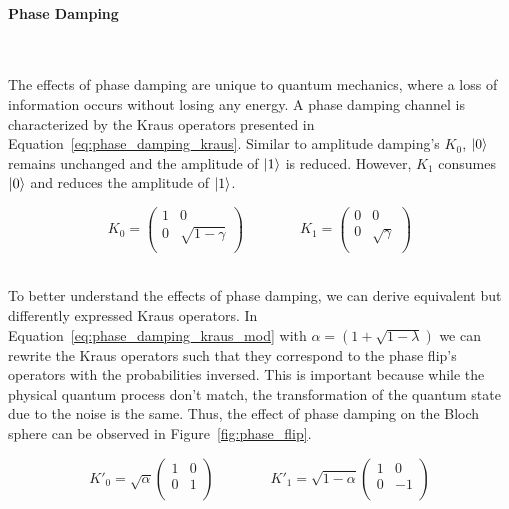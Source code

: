 \paragraph{Phase Damping} \

The effects of phase damping are unique to quantum mechanics, where
a loss of information occurs without losing any energy. A phase
damping channel is characterized by the Kraus operators presented
in Equation~\ref{eq:phase_damping_kraus}. Similar to amplitude
damping's \(K_0\), \(\ket{0}\) remains unchanged and the amplitude
of \(\ket{1}\) is reduced. However, \(K_1\) consumes \(\ket{0}\)
and reduces the amplitude of \(\ket{1}\). \

\begin{equation}\label{eq:phase_damping_kraus}
  K_0 = \begin{pmatrix}
          1 & 0 \\
          0 & \sqrt{1-\gamma} \\
        \end{pmatrix} \qquad \qquad
  K_1 = \begin{pmatrix}
          0 & 0 \\
          0 & \sqrt{\gamma} \\
        \end{pmatrix}
\end{equation} \

To better understand the effects of phase damping, we can derive equivalent but
differently expressed Kraus operators. In Equation~\ref{eq:phase_damping_kraus_mod}
with \(\alpha = \left(1 + \sqrt{1 - \lambda}\right)\) we can rewrite the
Kraus operators such that they correspond to the phase flip's operators with
the probabilities inversed. This is important because while the physical
quantum process don't match, the transformation of the quantum state due to
the noise is the same. Thus, the effect of phase damping on the Bloch sphere
can be observed in Figure~\ref{fig:phase_flip}. \

\begin{equation}\label{eq:phase_damping_kraus_mod}
  K'_0 = \sqrt{\alpha} \begin{pmatrix}
    1 & 0 \\
    0 & 1 \\
  \end{pmatrix} \qquad \qquad
  K'_1 = \sqrt{1-\alpha} \begin{pmatrix}
    1 & 0 \\
    0 & -1 \\
  \end{pmatrix}
\end{equation} \

